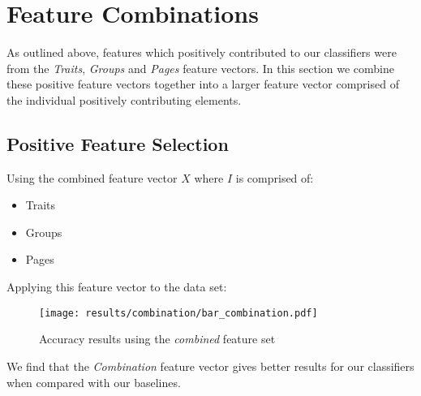 
\chapter{Feature Combinations}
\label{cha:bma}

As outlined above, features which positively contributed to our classifiers were from the \emph{Traits}, \emph{Groups} and \emph{Pages} feature 
vectors. In this section we combine these positive feature vectors together into a larger feature vector comprised of the individual 
positively contributing elements.

\section{Positive Feature Selection}
\label{sec:notation}

Using the combined feature vector $X$ where $I$ is comprised of:
\begin{itemize}
\item Traits
\item Groups
\item Pages
\end{itemize}

\clearpage

Applying this feature vector to the data set:

\begin{figure}[h]
	\begin{center}
		\texttt{[image: results/combination/bar\_combination.pdf]}
		\caption{Accuracy results using the \emph{combined} feature set}
	\end{center}
\end{figure}

\clearpage

We find that the \emph{Combination} feature vector gives better results for our classifiers when compared with our baselines.

